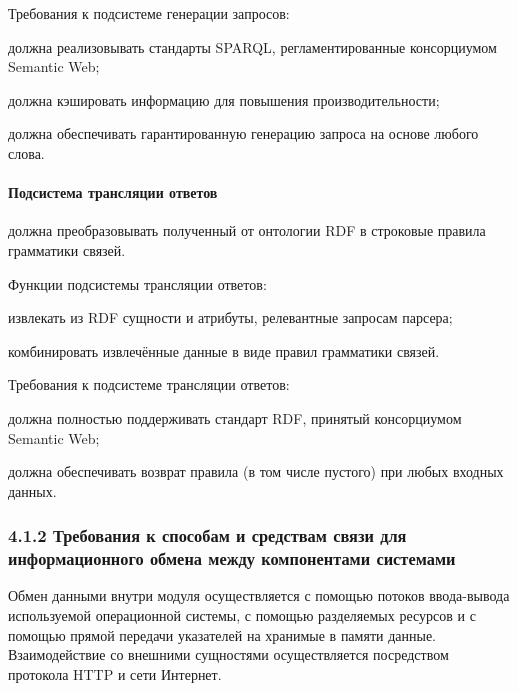 Требования к подсистеме генерации запросов:
\begin{list}{}{\leftmargin=1.5cm}
  \item должна реализовывать стандарты SPARQL, регламентированные консорциумом Semantic Web;
  \item должна кэшировать информацию для повышения производительности;
  \item должна обеспечивать гарантированную генерацию запроса на основе любого слова.
\end{list}

\paragraph{Подсистема трансляции ответов} должна преобразовывать полученный от онтологии RDF в строковые правила грамматики связей.

Функции подсистемы трансляции ответов:
\begin{list}{}{\leftmargin=1.5cm}
  \item извлекать из RDF сущности и атрибуты, релевантные запросам парсера;
  \item комбинировать извлечённые данные в виде правил грамматики связей.
\end{list}

Требования к подсистеме трансляции ответов:
\begin{list}{}{\leftmargin=1.5cm}
  \item должна полностью поддерживать стандарт RDF, принятый консорциумом Semantic Web;
  \item должна обеспечивать возврат правила (в том числе пустого) при любых входных данных.
\end{list}

\subsubsection*{4.1.2 Требования к способам и средствам связи для информационного обмена между компонентами системами}
Обмен данными внутри модуля осуществляется с помощью потоков ввода-вывода используемой операционной системы, с помощью разделяемых ресурсов и с помощью прямой передачи указателей на хранимые в памяти данные. Взаимодействие со внешними сущностями осуществляется посредством протокола HTTP и сети Интернет.

